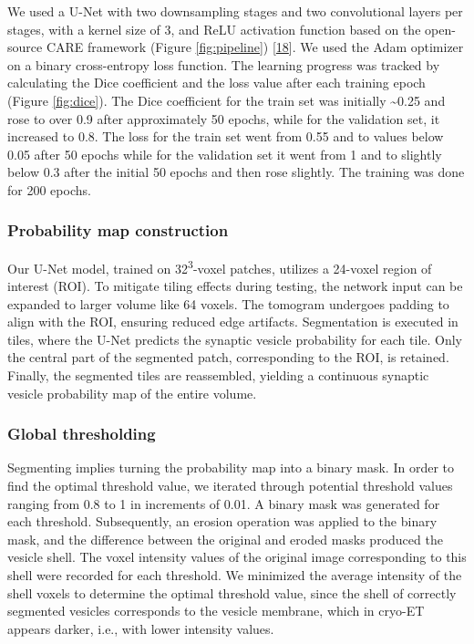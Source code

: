 We used a U-Net with two downsampling stages and two convolutional layers per stages, with a kernel size of 3, and ReLU activation function based on the open-source CARE framework (Figure \ref{fig:pipeline}) {[}\protect\hyperlink{ref-12G712Zky}{18}{]}.
We used the Adam optimizer on a binary cross-entropy loss function.
The learning progress was tracked by calculating the Dice coefficient and the loss value after each training epoch (Figure \ref{fig:dice}).
The Dice coefficient for the train set was initially \textasciitilde0.25 and rose to over 0.9 after approximately 50 epochs, while for the validation set, it increased to 0.8.
The loss for the train set went from 0.55 and to values below 0.05 after 50 epochs while for the validation set it went from 1 and to slightly below 0.3 after the initial 50 epochs and then rose slightly.
The training was done for 200 epochs.

\hypertarget{probability-map-construction}{%
\subsubsection{Probability map construction}\label{probability-map-construction}}

Our U-Net model, trained on 32\textsuperscript{3}-voxel patches, utilizes a 24-voxel region of interest (ROI).
To mitigate tiling effects during testing, the network input can be expanded to larger volume like 64 voxels.
The tomogram undergoes padding to align with the ROI, ensuring reduced edge artifacts.
Segmentation is executed in tiles, where the U-Net predicts the synaptic vesicle probability for each tile.
Only the central part of the segmented patch, corresponding to the ROI, is retained.
Finally, the segmented tiles are reassembled, yielding a continuous synaptic vesicle probability map of the entire volume.

\hypertarget{global-thresholding}{%
\subsubsection{Global thresholding}\label{global-thresholding}}

Segmenting implies turning the probability map into a binary mask.
In order to find the optimal threshold value, we iterated through potential threshold values ranging from 0.8 to 1 in increments of 0.01.
A binary mask was generated for each threshold.
Subsequently, an erosion operation was applied to the binary mask, and the difference between the original and eroded masks produced the vesicle shell.
The voxel intensity values of the original image corresponding to this shell were recorded for each threshold.
We minimized the average intensity of the shell voxels to determine the optimal threshold value, since the shell of correctly segmented vesicles corresponds to the vesicle membrane, which in cryo-ET appears darker, i.e., with lower intensity values.


